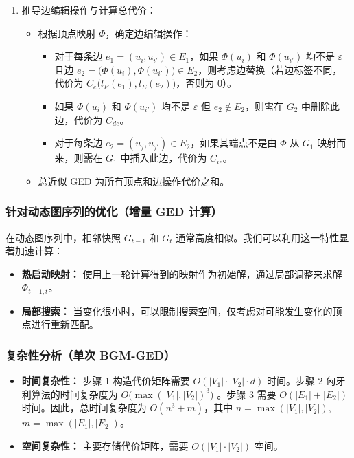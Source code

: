 \begin{enumerate}[label=\arabic*.]
\item 推导边编辑操作与计算总代价：
\begin{itemize}[leftmargin=*,nosep]
  \item 根据顶点映射 $\Phi$，确定边编辑操作：
  \begin{itemize}
    \item 对于每条边 $e_1=(u_i,u_{i'})\in E_1$，如果 $\Phi(u_i)$ 和 $\Phi(u_{i'})$ 均不是 $\varepsilon$ 且边 $e_2=\bigl(\Phi(u_i),\Phi(u_{i'})\bigr)\in E_2$，则考虑边替换（若边标签不同，代价为 $C_e\!\bigl(l_E(e_1),l_E(e_2)\bigr)$，否则为 $0$）。
    \item 如果 $\Phi(u_i)$ 和 $\Phi(u_{i'})$ 均不是 $\varepsilon$ 但 $e_2\notin E_2$，则需在 $G_2$ 中删除此边，代价为 $C_{de}$。
    \item 对于每条边 $e_2=(u_j,u_{j'})\in E_2$，如果其端点不是由 $\Phi$ 从 $G_1$ 映射而来，则需在 $G_1$ 中插入此边，代价为 $C_{ie}$。
  \end{itemize}
  \item 总近似 GED 为所有顶点和边操作代价之和。
\end{itemize}
\end{enumerate}

\subsubsection*{针对动态图序列的优化（增量 GED 计算）}
在动态图序列中，相邻快照 $G_{t-1}$ 和 $G_t$ 通常高度相似。我们可以利用这一特性显著加速计算：
\begin{itemize}[leftmargin=*,nosep]
  \item \textbf{热启动映射：} 使用上一轮计算得到的映射作为初始解，通过局部调整来求解 $\Phi_{t-1,t}$。
  \item \textbf{局部搜索：} 当变化很小时，可以限制搜索空间，仅考虑对可能发生变化的顶点进行重新匹配。
\end{itemize}

\subsubsection*{复杂性分析（单次 BGM-GED）}
\begin{itemize}[leftmargin=*,nosep]
  \item \textbf{时间复杂性：} 步骤 1 构造代价矩阵需要 $O(|V_1|\cdot|V_2|\cdot d)$ 时间。步骤 2 匈牙利算法的时间复杂度为 $O\!\bigl(\max(|V_1|,|V_2|)^3\bigr)$ \cite{riesen2009approximate}。步骤 3 需要 $O(|E_1|+|E_2|)$ 时间。因此，总时间复杂度为 $O(n^3+m)$，其中 $n=\max(|V_1|,|V_2|)$, $m=\max(|E_1|,|E_2|)$。
  \item \textbf{空间复杂性：} 主要存储代价矩阵，需要 $O(|V_1|\cdot|V_2|)$ 空间。
\end{itemize}

